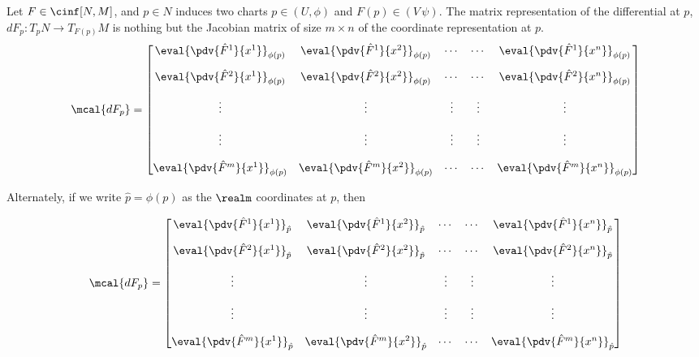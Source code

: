 \documentclass[../main-v2-manifolds.tex]{subfiles}
\begin{document}
\begin{wts}
Let $F\in \cinf[N,M]$, and $p\in N$ induces two charts $p\in (U,\phi)$ and $F(p)\in(V\,\psi)$. The matrix representation of the differential at $p$, $dF_p: T_p N\to T_{F(p)}M$ is nothing but the Jacobian matrix of size $m\times n$ of the coordinate representation at $p$.
\begin{equation}\label{lee-chap3:jacobian-matrix-representation}
        \mcal\{dF_p\} = \begin{bmatrix}\eval{\pdv{\hat{F}^1}{x^1}}_{\phi(p)} & \eval{\pdv{\hat{F}^1}{x^2}}_{\phi(p)} & \cdots & \cdots & \eval{\pdv{\hat{F}^1}{x^n}}_{\phi(p)} \\[1em] \eval{\pdv{\hat{F}^2}{x^1}}_{\phi(p)} & \eval{\pdv{\hat{F}^2}{x^2}}_{\phi(p)} & \cdots & \cdots & \eval{\pdv{\hat{F}^2}{x^n}}_{\phi(p)} \\[1em] \vdots & \vdots & \vdots & \vdots & \vdots \\[1em] \vdots & \vdots & \vdots & \vdots & \vdots \\[1em] \eval{\pdv{\hat{F}^m}{x^1}}_{\phi(p)} & \eval{\pdv{\hat{F}^m}{x^2}}_{\phi(p)} & \cdots & \cdots & \eval{\pdv{\hat{F}^m}{x^n}}_{\phi(p)}\end{bmatrix}
\end{equation}

Alternately, if we write $\hat{p} = \phi(p)$ as the $\realm$ coordinates at $p$, then

\begin{equation}\label{lee-chap3:jacobian-matrix-representation-alternate}
        \mcal\{dF_p\} = \begin{bmatrix}\eval{\pdv{\hat{F}^1}{x^1}}_{\hat{p}} & \eval{\pdv{\hat{F}^1}{x^2}}_{\hat{p}} & \cdots & \cdots & \eval{\pdv{\hat{F}^1}{x^n}}_{\hat{p}} \\[1em] \eval{\pdv{\hat{F}^2}{x^1}}_{\hat{p}} & \eval{\pdv{\hat{F}^2}{x^2}}_{\hat{p}} & \cdots & \cdots & \eval{\pdv{\hat{F}^2}{x^n}}_{\hat{p}} \\[1em] \vdots & \vdots & \vdots & \vdots & \vdots \\[1em] \vdots & \vdots & \vdots & \vdots & \vdots \\[1em] \eval{\pdv{\hat{F}^m}{x^1}}_{\hat{p}} & \eval{\pdv{\hat{F}^m}{x^2}}_{\hat{p}} & \cdots & \cdots & \eval{\pdv{\hat{F}^m}{x^n}}_{\hat{p}}\end{bmatrix}
\end{equation}
\end{wts}
\end{document}
